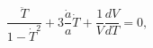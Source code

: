 \begin{equation}\label{Teq}
\frac{\ddot T}{1-\dot T^2}+3\frac{\dot a}{a}\dot T
+\frac{1}{V}\frac{dV}{dT}=0,
\end{equation}

